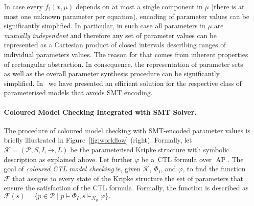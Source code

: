 \documentclass{llncs}
\DeclareMathOperator{\AP}{AP}
\newcommand{\VR}{\mathit{VR}}
\begin{document}


\enlargethispage*{5mm}
\begin{remark}
In case every $f_i(x,\mu)$ depends on at most a single component in $\mu$ (there is at most one unknown parameter per equation), encoding of parameter values can be significantly simplified. In particular, in such case all parameters in $\mu$ are \emph{mutually independent} and therefore any set of parameter values can be represented as a Cartesian product of closed intervals describing ranges of individual parameters values. The reason for that comes from inherent properties of rectangular abstraction. In consequence, the representation of parameter sets as well as the overall parameter synthesis procedure can be significantly simplified. In~\cite{CMSB15} we have presented an efficient solution for the respective class of parameterised models that avoids SMT encoding. 
\end{remark}

\paragraph{Coloured Model Checking Integrated with SMT Solver.}


The procedure of coloured model checking with SMT-encoded parameter values is briefly illustrated in Figure~\ref{fig:workflow} (right). Formally, let $\mathcal K = (\mathcal P, S, I, \mathord{\to}, L)$ be the parameterised Kripke
structure with symbolic description as explained above. Let further $\varphi$ be a~CTL
formula over $\AP$. The goal of \emph{coloured CTL model checking} is, given
$\mathcal K$, $\Phi_I$, and $\varphi$, to find the function $\mathcal F$
that assigns to every state of the Kripke structure the set of parameters
that ensure the satisfaction of the CTL formula. Formally, the function
is described as 
$\mathcal F(s) = \{ p \in \mathcal P \mid
	p \models \Phi_I, s \models_{\mathcal K_p} \varphi \}.$
\end{document}
